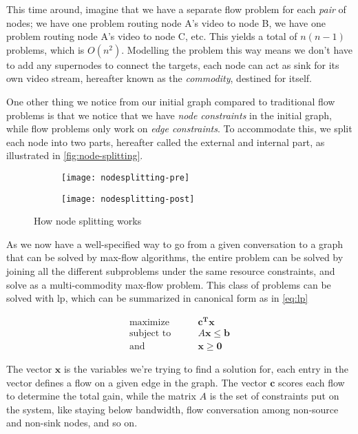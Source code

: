 This time around, imagine that we have a separate flow problem for each \emph{pair} of nodes; we have one problem routing node A's video to node B, we have one problem routing node A's video to node C, etc. This yields a total of $n(n-1)$ problems, which is $O(n^2)$. Modelling the problem this way means we don't have to add any supernodes to connect the targets, each node can act as sink for its own video stream, hereafter known as the \emph{commodity}, destined for itself.

One other thing we notice from our initial graph compared to traditional flow problems is that we notice that we have \emph{node constraints} in the initial graph, while flow problems only work on \emph{edge constraints}. To accommodate this, we split each node into two parts, hereafter called the external and internal part, as illustrated in \autoref{fig:node-splitting}.

\begin{figure}
    \centering
    \begin{subfigure}[t]{.48\textwidth}
        \centering
        \texttt{[image: nodesplitting-pre]}
    \end{subfigure}
    \hfill
    \begin{subfigure}[t]{.48\textwidth}
        \centering
        \texttt{[image: nodesplitting-post]}
    \end{subfigure}
    \caption{How node splitting works}
    \label{fig:node-splitting}
\end{figure}

As we now have a well-specified way to go from a given conversation to a graph that can be solved by max-flow algorithms, the entire problem can be solved by joining all the different subproblems under the same resource constraints, and solve as a multi-commodity max-flow problem. This class of problems can be solved with \gls{lp}, which can be summarized in canonical form as in \autoref{eq:lp}

\begin{align}\label{eq:lp}
    \text{maximize}\qquad &\mathbf{c^Tx} \\
    \text{subject to}\qquad &A\mathbf{x} \leq \mathbf{b} \nonumber \\
    \text{and}\qquad &\mathbf{x} \geq \mathbf{0} \nonumber
\end{align}

The vector $\mathbf{x}$ is the variables we're trying to find a solution for, each entry in the vector defines a flow on a given edge in the graph. The vector $\mathbf{c}$ scores each flow to determine the total gain, while the matrix $A$ is the set of constraints put on the system, like staying below bandwidth, flow conversation among non-source and non-sink nodes, and so on.

